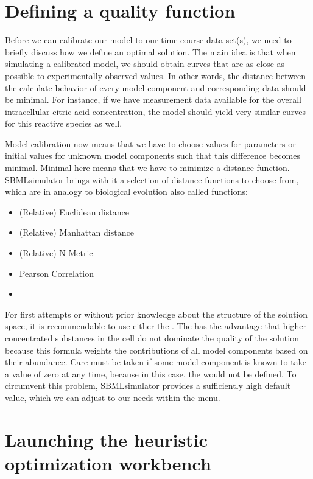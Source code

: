\section{Defining a quality function}
\label{sec:QualityDefinition}

Before we can calibrate our model to our time-course data set(s), we need to briefly discuss how we define an optimal solution.
The main idea is that when simulating a calibrated model, we should obtain curves that are as close as possible to experimentally observed values.
In other words, the distance between the calculate behavior of every model component and corresponding data should be minimal.
For instance, if we have measurement data available for the overall intracellular citric acid concentration, the model should yield very similar curves for this reactive species as well.

Model calibration now means that we have to choose values for parameters or initial values for unknown model components such that this difference becomes minimal.
Minimal here means that we have to minimize a distance function.
SBMLsimulator brings with it a selection of distance functions to choose from, which are in analogy to biological evolution also called \emph{\fitness} functions:
\begin{itemize}
  \item (Relative) Euclidean distance
  \item (Relative) Manhattan distance
  \item (Relative) N-Metric
  \item Pearson Correlation
  \item \RSE
\end{itemize}
For first attempts or without prior knowledge about the structure of the solution space, it is recommendable to use either the \RSE.
The \RSE has the advantage that higher concentrated substances in the cell do not dominate the quality of the solution because this formula weights the contributions of all model components based on their abundance.
Care must be taken if some model component is known to take a value of zero at any time, because in this case, the \RSE would not be defined.
To circumvent this problem, SBMLsimulator provides a sufficiently high default value, which we can adjust to our needs within the  menu.


\section{Launching the heuristic optimization workbench \EvA}
\label{sec:LaunchingEvA}

